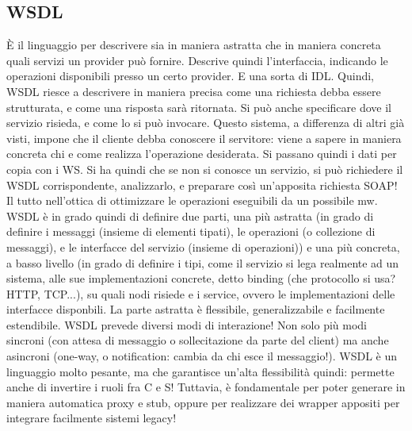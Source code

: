 \subsection{WSDL}
È il linguaggio per descrivere sia in maniera astratta che in maniera concreta quali servizi un provider può fornire.
Descrive quindi l'interfaccia, indicando le operazioni disponibili presso un certo provider. E una sorta di IDL.
Quindi, WSDL riesce a descrivere in maniera precisa come una richiesta debba essere strutturata, e come una risposta
sarà ritornata. Si può anche specificare dove il servizio risieda, e come lo si può invocare.
Questo sistema, a differenza di altri già visti, impone che il cliente debba conoscere il servitore: viene a sapere in
maniera concreta chi e come realizza l'operazione desiderata. Si passano quindi i dati per copia con i WS. Si ha quindi
che se non si conosce un servizio, si può richiedere il WSDL corrispondente, analizzarlo, e preparare così un'apposita
richiesta SOAP! Il tutto nell'ottica di ottimizzare le operazioni eseguibili da un possibile mw.
WSDL è in grado quindi di definire due parti, una più astratta (in grado di definire i messaggi (insieme di elementi
tipati), le operazioni (o collezione di messaggi), e le interfacce del servizio (insieme di operazioni)) e una più
concreta, a basso livello (in grado di definire i tipi, come il servizio si lega realmente ad un sistema, alle sue
implementazioni concrete, detto binding (che protocollo si usa? HTTP, TCP...), su quali nodi risiede e i service,
ovvero le implementazioni delle interfacce disponbili. La parte astratta è flessibile, generalizzabile e facilmente
estendibile.
WSDL prevede diversi modi di interazione! Non solo più modi sincroni (con attesa di messaggio o sollecitazione da
parte del client) ma anche asincroni (one-way, o notification: cambia da chi esce il messaggio!).
WSDL è un linguaggio molto pesante, ma che garantisce un'alta flessibilità quindi: permette anche di invertire i ruoli
fra C e S! Tuttavia, è fondamentale per poter generare in maniera automatica proxy e stub, oppure per realizzare
dei wrapper appositi per integrare facilmente sistemi legacy!
